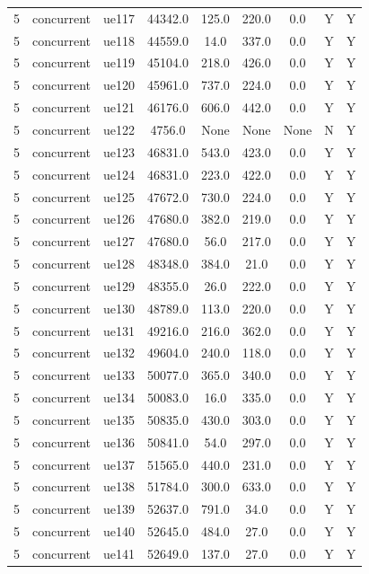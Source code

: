 \begin{table}[ht]
\begin{tabular}{|c|c|c|c|c|c|c|c|c|}
5 & concurrent & ue117 & 44342.0 & 125.0 & 220.0 & 0.0 & Y & Y \\
5 & concurrent & ue118 & 44559.0 & 14.0 & 337.0 & 0.0 & Y & Y \\
5 & concurrent & ue119 & 45104.0 & 218.0 & 426.0 & 0.0 & Y & Y \\
5 & concurrent & ue120 & 45961.0 & 737.0 & 224.0 & 0.0 & Y & Y \\
5 & concurrent & ue121 & 46176.0 & 606.0 & 442.0 & 0.0 & Y & Y \\
5 & concurrent & ue122 & 4756.0 & None & None & None & N & Y \\
5 & concurrent & ue123 & 46831.0 & 543.0 & 423.0 & 0.0 & Y & Y \\
5 & concurrent & ue124 & 46831.0 & 223.0 & 422.0 & 0.0 & Y & Y \\
5 & concurrent & ue125 & 47672.0 & 730.0 & 224.0 & 0.0 & Y & Y \\
5 & concurrent & ue126 & 47680.0 & 382.0 & 219.0 & 0.0 & Y & Y \\
5 & concurrent & ue127 & 47680.0 & 56.0 & 217.0 & 0.0 & Y & Y \\
5 & concurrent & ue128 & 48348.0 & 384.0 & 21.0 & 0.0 & Y & Y \\
5 & concurrent & ue129 & 48355.0 & 26.0 & 222.0 & 0.0 & Y & Y \\
5 & concurrent & ue130 & 48789.0 & 113.0 & 220.0 & 0.0 & Y & Y \\
5 & concurrent & ue131 & 49216.0 & 216.0 & 362.0 & 0.0 & Y & Y \\
5 & concurrent & ue132 & 49604.0 & 240.0 & 118.0 & 0.0 & Y & Y \\
5 & concurrent & ue133 & 50077.0 & 365.0 & 340.0 & 0.0 & Y & Y \\
5 & concurrent & ue134 & 50083.0 & 16.0 & 335.0 & 0.0 & Y & Y \\
5 & concurrent & ue135 & 50835.0 & 430.0 & 303.0 & 0.0 & Y & Y \\
5 & concurrent & ue136 & 50841.0 & 54.0 & 297.0 & 0.0 & Y & Y \\
5 & concurrent & ue137 & 51565.0 & 440.0 & 231.0 & 0.0 & Y & Y \\
5 & concurrent & ue138 & 51784.0 & 300.0 & 633.0 & 0.0 & Y & Y \\
5 & concurrent & ue139 & 52637.0 & 791.0 & 34.0 & 0.0 & Y & Y \\
5 & concurrent & ue140 & 52645.0 & 484.0 & 27.0 & 0.0 & Y & Y \\
5 & concurrent & ue141 & 52649.0 & 137.0 & 27.0 & 0.0 & Y & Y \\

\end{tabular}
\end{table}
